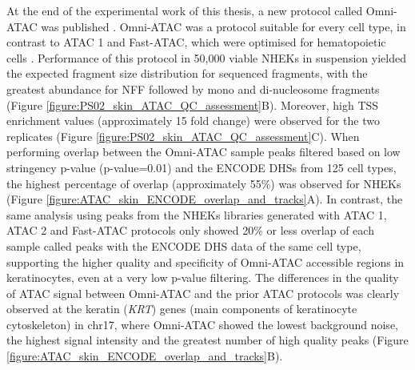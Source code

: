 At the end of the experimental work of this thesis, a new protocol called Omni-ATAC was published \parencite{Corces2017}. Omni-ATAC was a protocol suitable for every cell type, in contrast to ATAC 1 and Fast-ATAC, which were optimised for hematopoietic cells \parencite{Buenrostro2013,Corces2016}. Performance of this protocol in 50,000 viable NHEKs in suspension yielded the expected fragment size distribution for sequenced fragments, with the greatest abundance for NFF followed by mono and di-nucleosome fragments (Figure \ref{figure:PS02_skin_ATAC_QC_assessment}B). Moreover, high TSS enrichment values (approximately 15 fold change) were observed for the two replicates (Figure \ref{figure:PS02_skin_ATAC_QC_assessment}C). When performing overlap between the Omni-ATAC sample peaks filtered based on low stringency p-value (p-value=0.01) and the ENCODE DHSs from 125 cell types, the highest percentage of overlap (approximately 55\%) was observed for NHEKs (Figure \ref{figure:ATAC_skin_ENCODE_overlap_and_tracks}A). In contrast, the same analysis using peaks from the NHEKs libraries generated with ATAC 1, ATAC 2 and Fast-ATAC protocols only showed 20\% or less overlap of each sample called peaks with the ENCODE DHS data of the same cell type, supporting the higher quality and specificity of Omni-ATAC accessible regions in keratinocytes, even at a very low p-value filtering. The differences in the quality of ATAC signal between Omni-ATAC and the prior ATAC protocols was clearly observed at the keratin (\textit{KRT}) genes (main components of keratinocyte cytoskeleton) in chr17, where Omni-ATAC showed the lowest background noise, the highest signal intensity and the greatest number of high quality peaks (Figure \ref{figure:ATAC_skin_ENCODE_overlap_and_tracks}B). 

